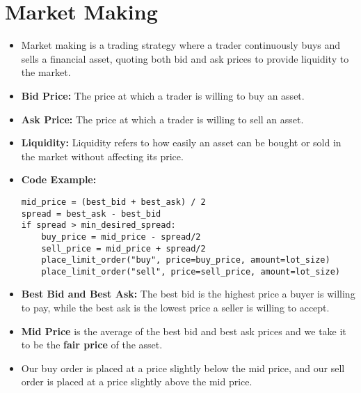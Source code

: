 \documentclass{article}
\begin{document}
\section*{Market Making}
\begin{itemize}
    \item Market making is a trading strategy where a trader continuously buys and sells a financial asset, quoting both bid and ask prices to provide liquidity to the market.
    \item \textbf{Bid Price:} The price at which a trader is willing to buy an asset.
    \item \textbf{Ask Price:} The price at which a trader is willing to sell an asset.
    \item \textbf{Liquidity:} Liquidity refers to how easily an asset can be bought or sold in the market without affecting its price.
    \item \textbf{Code Example:}
    \begin{lstlisting}
mid_price = (best_bid + best_ask) / 2
spread = best_ask - best_bid
if spread > min_desired_spread:
    buy_price = mid_price - spread/2
    sell_price = mid_price + spread/2
    place_limit_order("buy", price=buy_price, amount=lot_size)
    place_limit_order("sell", price=sell_price, amount=lot_size)
    \end{lstlisting}
    \item \textbf{Best Bid and Best Ask:} The best bid is the highest price a buyer is willing to pay, while the best ask is the lowest price a seller is willing to accept.
    \item \textbf{Mid Price} is the average of the best bid and best ask prices and we take it to be the \textbf{fair price} of the asset.
    \item Our buy order is placed at a price slightly below the mid price, and our sell order is placed at a price slightly above the mid price.
\end{itemize}
\end{document}
